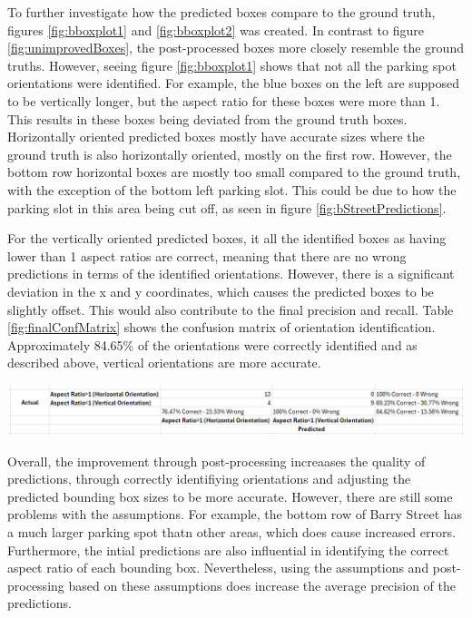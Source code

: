 \documentclass[man]{apa7}
\begin{document}
To further investigate how the predicted boxes compare to the ground truth, figures \ref{fig:bboxplot1} and \ref{fig:bboxplot2} was created. In contrast to figure \ref{fig:unimprovedBoxes}, the post-processed boxes more closely resemble the ground truths. However, seeing figure \ref{fig:bboxplot1} shows that not all the parking spot orientations were identified. For example, the blue boxes on the left are supposed to be vertically longer, but the aspect ratio for these boxes were more than 1. This results in these boxes being deviated from the ground truth boxes. Horizontally oriented predicted boxes mostly have accurate sizes where the ground truth is also horizontally oriented, mostly on the first row. However, the bottom row horizontal boxes are mostly too small compared to the ground truth, with the exception of the bottom left parking slot. This could be due to how the parking slot in this area being cut off, as seen in figure \ref{fig:bStreetPredictions}.

For the vertically oriented predicted boxes, it all the identified boxes as having lower than 1 aspect ratios are correct, meaning that there are no wrong predictions in terms of the identified orientations. However, there is a significant deviation in the x and y coordinates, which causes the predicted boxes to be slightly offset. This would also contribute to the final precision and recall. Table \ref{fig:finalConfMatrix} shows the confusion matrix of orientation identification. Approximately 84.65\% of the orientations were correctly identified and as described above, vertical orientations are more accurate.

\begin{minipage}{\linewidth}
  \includegraphics[width=\textwidth/1]{figures/finalConfMatrix.png}
  \label{fig:finalConfMatrix}
\end{minipage}

Overall, the improvement through post-processing increaases the quality of predictions, through correctly identifiying orientations and adjusting the predicted bounding box sizes to be more accurate. However, there are still some problems with the assumptions. For example, the bottom row of Barry Street has a much larger parking spot thatn other areas, which does cause increased errors. Furthermore, the intial predictions are also influential in identifying the correct aspect ratio of each bounding box. Nevertheless, using the assumptions and post-processing based on these assumptions does increase the average precision of the predictions.
\end{document}
